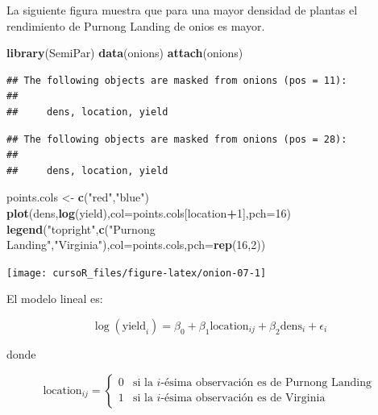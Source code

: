 \documentclass[]{book}
\newenvironment{Shaded}{\begin{snugshade}}{\end{snugshade}}
\newcommand{\KeywordTok}[1]{\textcolor[rgb]{0.13,0.29,0.53}{\textbf{#1}}}
\newcommand{\DataTypeTok}[1]{\textcolor[rgb]{0.13,0.29,0.53}{#1}}
\newcommand{\DecValTok}[1]{\textcolor[rgb]{0.00,0.00,0.81}{#1}}
\newcommand{\StringTok}[1]{\textcolor[rgb]{0.31,0.60,0.02}{#1}}
\newcommand{\OperatorTok}[1]{\textcolor[rgb]{0.81,0.36,0.00}{\textbf{#1}}}
\newcommand{\NormalTok}[1]{#1}
\begin{document}
La siguiente figura muestra que para una mayor densidad de plantas el
rendimiento de Purnong Landing de onios es mayor.

\begin{Shaded}
\begin{Highlighting}[]
\KeywordTok{library}\NormalTok{(SemiPar)}
\KeywordTok{data}\NormalTok{(onions)}
\KeywordTok{attach}\NormalTok{(onions)}
\end{Highlighting}
\end{Shaded}

\begin{verbatim}
## The following objects are masked from onions (pos = 11):
## 
##     dens, location, yield
\end{verbatim}

\begin{verbatim}
## The following objects are masked from onions (pos = 28):
## 
##     dens, location, yield
\end{verbatim}

\begin{Shaded}
\begin{Highlighting}[]
\NormalTok{points.cols <-}\StringTok{ }\KeywordTok{c}\NormalTok{(}\StringTok{"red"}\NormalTok{,}\StringTok{"blue"}\NormalTok{)}
\KeywordTok{plot}\NormalTok{(dens,}\KeywordTok{log}\NormalTok{(yield),}\DataTypeTok{col=}\NormalTok{points.cols[location}\OperatorTok{+}\DecValTok{1}\NormalTok{],}\DataTypeTok{pch=}\DecValTok{16}\NormalTok{)}
\KeywordTok{legend}\NormalTok{(}\StringTok{"topright"}\NormalTok{,}\KeywordTok{c}\NormalTok{(}\StringTok{"Purnong Landing"}\NormalTok{,}\StringTok{"Virginia"}\NormalTok{),}\DataTypeTok{col=}\NormalTok{points.cols,}\DataTypeTok{pch=}\KeywordTok{rep}\NormalTok{(}\DecValTok{16}\NormalTok{,}\DecValTok{2}\NormalTok{))}
\end{Highlighting}
\end{Shaded}

\begin{center}\texttt{[image: cursoR\_files/figure-latex/onion-07-1]} \end{center}

El modelo lineal es:

\[
\log(\text{yield}_i) = \beta_0 + \beta_1\text{location}_{ij} + \beta_2 \text{dens}_i + \epsilon_i
\]

donde

\[
\text{location}_{ij} =
\left\{
\begin{array}{cl}
0 & \mbox{si la $i$-ésima observación es de Purnong Landing} \\
1 & \mbox{si la $i$-ésima observación es de Virginia}
\end{array}
\right.
\]
\end{document}
